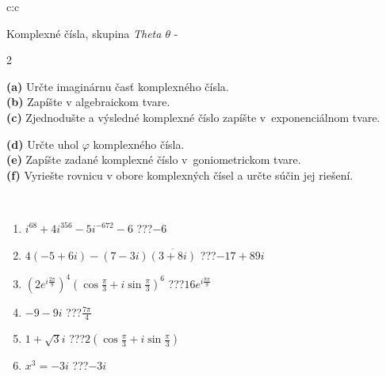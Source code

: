 \documentclass[10pt]{report}
\begin{document}
\begin{tabular}{c:c}
\begin{minipage}[c][104.5mm][t]{0.5\linewidth}
\begin{center}
\vspace{7mm}
{\huge Komplexné čísla, skupina \textit{Theta $\theta$} -}\\[5mm]
\begin{minipage}{0.95\linewidth}
\begin{center}
{\small \begin{multicols}{2} \raggedright
\textbf{(a)} Určte imaginárnu časť komplexného čísla. \\[1mm]
\textbf{(b)} Zapíšte v algebraickom tvare. \\[1mm]
\textbf{(c)} Zjednodušte a výsledné komplexné číslo zapíšte v~exponenciálnom tvare. \par \columnbreak
\textbf{(d)} Určte uhol \(\varphi\) komplexného čísla. \\[1mm]
\textbf{(e)} Zapíšte zadané komplexné číslo v~goniometrickom tvare. \\[1mm]
\textbf{(f)} Vyriešte rovnicu v obore komplexných čísel a určte súčin jej riešení.
\end{multicols}
}
\end{center}
\end{minipage}
\\[4mm]
\begin{minipage}{0.79\linewidth}
\begin{center}
\begin{varwidth}{\linewidth}
\begin{enumerate}
\large
\item $i^{68}+4i^{356}-5i^{-672}-6$\quad \dotfill\; ???\;\dotfill \quad $-6$
\item $4(-5+6i)-(7-3i)\overline{(3+8i)}$\quad \dotfill\; ???\;\dotfill \quad $-17+89i$
\item $\left(2e^{i\frac{2\pi}{9}}\right)^{4}\left(\cos{\frac{\pi}{3}}+i\sin{\frac{\pi}{3}}\right)^{6}$\quad \dotfill\; ???\;\dotfill \quad $16e^{i\frac{8\pi}{9}}$
\item $-9-9i$\quad \dotfill\; ???\;\dotfill \quad $\frac{7\pi}{4}$
\item $1+\sqrt{3}i$\quad \dotfill\; ???\;\dotfill \quad $2\left(\cos{\frac{\pi}{3}}+i\sin{\frac{\pi}{3}}\right)$
\item $x^3=-3i$\quad \dotfill\; ???\;\dotfill \quad $-3i$
\end{enumerate}
\end{varwidth}

\end{center}
\end{minipage}
\end{center}
\end{minipage}
\end{tabular}
\end{document}
